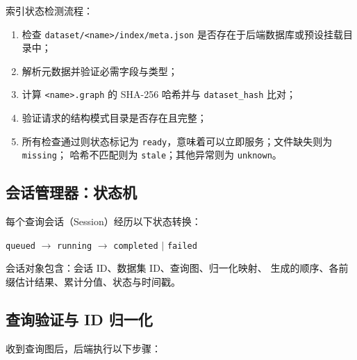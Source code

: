 \documentclass[12pt,a4paper]{article}
\begin{document}
索引状态检测流程：
\begin{enumerate}
  \item 检查 \texttt{dataset/<name>/index/meta.json} 是否存在于后端数据库或预设挂载目录中；
  \item 解析元数据并验证必需字段与类型；
  \item 计算 \texttt{<name>.graph} 的 SHA-256 哈希并与 \texttt{dataset\_hash} 比对；
  \item 验证请求的结构模式目录是否存在且完整；
  \item 所有检查通过则状态标记为 \texttt{ready}，意味着可以立即服务；文件缺失则为 \texttt{missing}；
        哈希不匹配则为 \texttt{stale}；其他异常则为 \texttt{unknown}。
\end{enumerate}

\subsection{会话管理器：状态机}
\label{sec:session-manager}

每个查询会话（Session）经历以下状态转换：

\begin{center}
  \texttt{queued} $\longrightarrow$ \texttt{running} $\longrightarrow$
  \texttt{completed} $\mid$ \texttt{failed}
\end{center}

会话对象包含：会话 ID、数据集 ID、查询图、归一化映射、
生成的顺序、各前缀估计结果、累计分值、状态与时间戳。

\subsection{查询验证与 ID 归一化}
\label{sec:query-validation}

收到查询图后，后端执行以下步骤：
\end{document}
